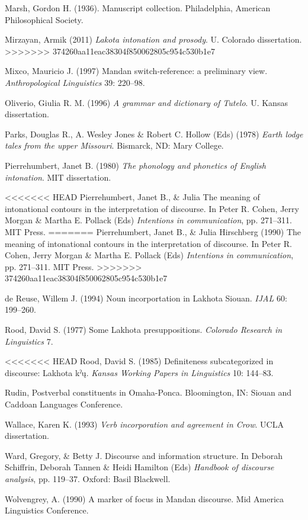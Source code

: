 \documentclass[output=paper]{LSP/langsci}
\begin{document}
\begin{reflist}
\begin{reflist}
Marsh, Gordon H. (1936). Manuscript collection. Philadelphia, American Philosophical Society.

Mirzayan, Armik (2011) \emph{Lakota intonation and prosody}. U. Colorado dissertation.
>>>>>>> 374260aa11eac38304f850062805c954c530b1e7

Mixco, Mauricio J. (1997) Mandan switch-reference: a preliminary view. \emph{Anthropological Linguistics} 39: 220--98.

Oliverio, Giulia R. M. (1996) \emph{A grammar and dictionary of Tutelo}. U. Kansas dissertation.

Parks, Douglas R., A. Wesley Jones \& Robert C. Hollow (Eds) (1978) \emph{Earth lodge tales from the upper Missouri}. Bismarck, ND: Mary College.

Pierrehumbert, Janet B. (1980) \emph{The phonology and phonetics of English intonation}. MIT dissertation.

<<<<<<< HEAD
Pierrehumbert, Janet B., \& Julia \citet{Hirschberg1990} The meaning of intonational contours in the interpretation of discourse. In Peter R. Cohen, Jerry Morgan \& Martha E. Pollack (Eds) \emph{Intentions in communication}, pp. 271--311. MIT Press.
=======
Pierrehumbert, Janet B., \& Julia Hirschberg (1990) The meaning of intonational contours in the interpretation of discourse. In Peter R. Cohen, Jerry Morgan \& Martha E. Pollack (Eds) \emph{Intentions in communication}, pp. 271--311. MIT Press.
>>>>>>> 374260aa11eac38304f850062805c954c530b1e7

de Reuse, Willem J. (1994) Noun incorportation in Lakhota Siouan. \emph{IJAL} 60: 199--260.

Rood, David S. (1977) Some Lakhota presuppositions. \emph{Colorado Research in Linguistics} 7.

<<<<<<< HEAD
Rood, David S. (1985) Definiteness subcategorized in discourse: Lakhota kˀų. \emph{Kansas Working Papers in Linguistics} 10: 144--83.

Rudin, \citet{Catherine1998} Postverbal constituents in Omaha-Ponca. Bloomington, IN: Siouan and Caddoan Languages Conference. 

Wallace, Karen K. (1993) \emph{Verb incorporation and agreement in Crow}. UCLA dissertation.

Ward, Gregory, \& Betty J. \citet{Birner2001} Discourse and information structure. In Deborah Schiffrin, Deborah Tannen \& Heidi Hamilton (Eds) \emph{Handbook of discourse analysis}, pp. 119--37. Oxford: Basil Blackwell.

Wolvengrey, A. (1990) A marker of focus in Mandan discourse. Mid America Linguistics Conference.


\end{reflist}
\end{reflist}
\end{document}
